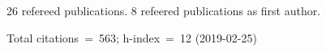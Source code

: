 26 refereed publications. 8 refeered publications as first author.

Total citations~=~563; h-index~=~12 (2019-02-25)
